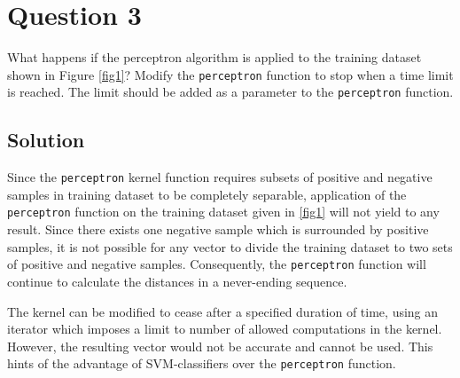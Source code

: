 \section*{Question 3}

What happens if the perceptron algorithm is applied to the training dataset shown in Figure \ref{fig1}? Modify the \texttt{perceptron} function to stop when a time limit is reached. The limit should be added as a parameter to the \texttt{perceptron} function.

\subsection*{Solution}

Since the \texttt{perceptron} kernel function requires subsets of positive and negative samples in training dataset to be completely separable, application of the \texttt{perceptron} function on the training dataset given in \ref{fig1} will not yield to any result. Since there exists one negative sample which is surrounded by positive samples, it is not possible for any vector to divide the training dataset to two sets of positive and negative samples. Consequently, the \texttt{perceptron} function will continue to calculate the distances in a never-ending sequence.

The kernel can be modified to cease after a specified duration of time, using an iterator which imposes a limit to number of allowed computations in the kernel. However, the resulting vector would not be accurate and cannot be used. This hints of the advantage of SVM-classifiers over the \texttt{perceptron} function.
